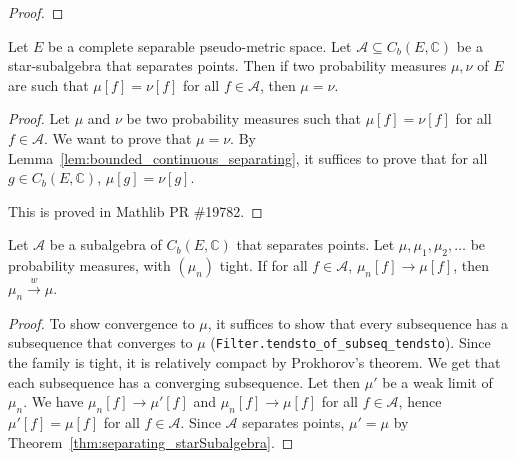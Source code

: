 \begin{proof}\leanok
{}
\end{proof}


\begin{theorem}\label{thm:separating_starSubalgebra}
\mathlibok
{}
Let $E$ be a complete separable pseudo-metric space. Let $\mathcal A \subseteq C_b(E, \mathbb{C})$ be a star-subalgebra that separates points.
Then if two probability measures $\mu, \nu$ of $E$ are such that $\mu[f] = \nu[f]$ for all $f \in \mathcal A$, then $\mu = \nu$.
\end{theorem}

\begin{proof}
\leanok
Let $\mu$ and $\nu$ be two probability measures such that $\mu[f] = \nu[f]$ for all $f \in \mathcal A$. We want to prove that $\mu = \nu$.
By Lemma~\ref{lem:bounded_continuous_separating}, it suffices to prove that for all $g \in C_b(E, \mathbb{C})$, $\mu[g] = \nu[g]$.

This is proved in Mathlib PR \#19782.
\end{proof}


\begin{lemma}\label{lem:cvg_of_separating}
\leanok
{}
Let $\mathcal A$ be a subalgebra of $C_b(E, \mathbb{C})$ that separates points. Let $\mu, \mu_1, \mu_2, \ldots$ be probability measures, with $(\mu_n)$ tight. If for all $f \in \mathcal A$, $\mu_n[f] \to \mu[f]$, then $\mu_n \xrightarrow{w} \mu$.
\end{lemma}

\begin{proof}
\leanok
To show convergence to $\mu$, it suffices to show that every subsequence has a subsequence that converges to $\mu$ (\texttt{Filter.tendsto\_of\_subseq\_tendsto}).
Since the family is tight, it is relatively compact by Prokhorov's theorem. We get that each subsequence has a converging subsequence.
Let then $\mu'$ be a weak limit of $\mu_n$. We have $\mu_n[f] \to \mu'[f]$ and $\mu_n[f] \to \mu[f]$ for all $f \in \mathcal A$, hence $\mu'[f] = \mu[f]$ for all $f \in \mathcal A$. Since $\mathcal A$ separates points, $\mathcal \mu' = \mu$ by Theorem~\ref{thm:separating_starSubalgebra}.
\end{proof}
